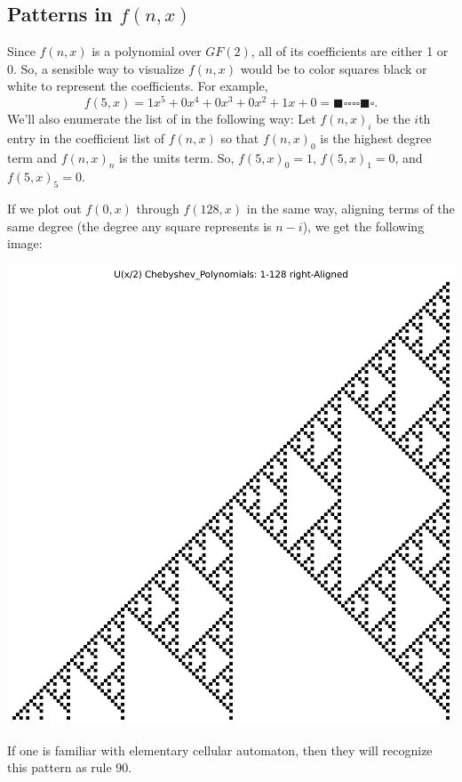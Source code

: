 \documentclass{article}
\begin{document}
	\subsection{Patterns in $f(n,x)$}
	Since $f(n,x)$ is a polynomial over $GF(2)$, all of its coefficients are either 1 or 0.
	So, a sensible way to visualize $f(n,x)$ would be to color squares black or white to represent the coefficients.
	For example,
	\begin{equation*}
		f(5,x) = 1x^5 + 0x^4 + 0x^3 + 0x^2 + 1x + 0 = \blacksquare\square\square\square\square\blacksquare\square.
	\end{equation*}
	We'll also enumerate the list of in the following way:
	Let $f(n,x)_i$ be the $i$th entry in the coefficient list of $f(n,x)$ so that $f(n,x)_0$ is the highest degree term and $f(n,x)_n$ is the units term.
	So, $f(5,x)_0 = 1$, $f(5,x)_1 = 0$, and $f(5,x)_5 = 0$.
	
	If we plot out $f(0,x)$ through $f(128,x)$ in the same way, aligning terms of the same degree (the degree any square represents is $n-i$), we get the following image:
	
	\begin{center}
		\includegraphics[width=.8\textwidth]{../../code/serialization/chebyshev/chebyshev1_right_128.png}	
	\end{center}
	
	If one is familiar with elementary cellular automaton, then they will recognize this pattern as rule 90.
\end{document}
